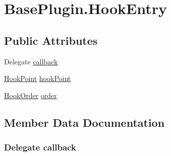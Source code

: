 \hypertarget{structOTA_1_1Plugin_1_1BasePlugin_1_1HookEntry}{}\section{Base\+Plugin.\+Hook\+Entry}
\label{structOTA_1_1Plugin_1_1BasePlugin_1_1HookEntry}
\subsection*{Public Attributes}
\begin{DoxyCompactItemize}
\item 
Delegate \hyperlink{structOTA_1_1Plugin_1_1BasePlugin_1_1HookEntry_a615c9538b7955ebac104faa2fb79a656}{callback}
\item 
\hyperlink{classOTA_1_1Plugin_1_1HookPoint}{Hook\+Point} \hyperlink{structOTA_1_1Plugin_1_1BasePlugin_1_1HookEntry_abd1ad8c99890c1669aada65a70334b82}{hook\+Point}
\item 
\hyperlink{namespaceOTA_1_1Plugin_a7c65b8c7c155fec0b559afbe2da809c0}{Hook\+Order} \hyperlink{structOTA_1_1Plugin_1_1BasePlugin_1_1HookEntry_a9520c74b73de393087c7b43e85afe624}{order}
\end{DoxyCompactItemize}


\subsection{Member Data Documentation}
\hypertarget{structOTA_1_1Plugin_1_1BasePlugin_1_1HookEntry_a615c9538b7955ebac104faa2fb79a656}{}
\subsubsection[{callback}]{\setlength{\rightskip}{0pt plus 5cm}Delegate callback}\label{structOTA_1_1Plugin_1_1BasePlugin_1_1HookEntry_a615c9538b7955ebac104faa2fb79a656}
\hypertarget{structOTA_1_1Plugin_1_1BasePlugin_1_1HookEntry_abd1ad8c99890c1669aada65a70334b82}{}

